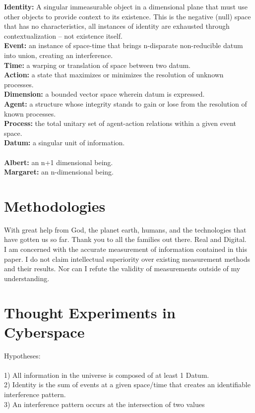 \documentclass{article}
\begin{document}
\textbf{Identity:} A singular immeasurable object in a dimensional plane that must use other objects to provide context to its existence. This is the negative (null) space that has no characteristics, all instances of identity are exhausted through contextualization – not existence itself. \\
\textbf{Event:} an instance of space-time that brings n-disparate non-reducible datum into union, creating an interference. \\
\textbf{Time:} a warping or translation of space between two datum. \\
\textbf{Action:} a state that maximizes or minimizes the resolution of unknown processes.\\ 
\textbf{Dimension:} a bounded vector space wherein datum is expressed. \\
\textbf{Agent:} a structure whose integrity stands to gain or lose from the resolution of known processes.\\   
\textbf{Process:} the total unitary set of agent-action relations within a given event space. \\
\textbf{Datum:} a singular unit of information. \\\\
\textbf{Albert:} an n+1 dimensional being. \\
\textbf{Margaret:} an n-dimensional being. \\

\section{Methodologies}
With great help from God, the planet earth, humans, and the technologies that have gotten us so far. Thank you to all the families out there. Real and Digital.  \\
I am concerned with the accurate measurement of information contained in this paper. I do not claim intellectual superiority over existing measurement methods and their results. Nor can I refute the validity of measurements outside of my understanding. \\

\section{Thought Experiments in Cyberspace}
Hypotheses: \\\\
1) All information in the universe is composed of at least 1 Datum. \\
2) Identity is the sum of events at a given space/time that creates an identifiable interference pattern.\\
3) An interference pattern occurs at the intersection of two values\\ 
\end{document}
